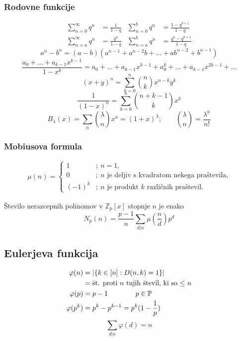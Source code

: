 	\subsubsection*{Rodovne funkcije}
	\[
		\begin{aligned}
			\sum_{n=0}^{\infty} q^n &= \frac{1}{1-q} &
			\sum_{n=0}^{b} q^n &= \frac{1-q^{b+1}}{1-q}
			\\
			\sum_{n=a}^{\infty} q^n &= \frac{q^{a}}{1-q} &
			\sum_{n=a}^{b} q^n &= \frac{q^a-q^{b+1}}{1-q}
		\end{aligned}
	\]
	\[
		a^n - b^n = (a-b)(a^{n-1} + a^{n-2}b + ... + ab^{n-2} + b^{n-1})  
	\]
	\[ \textstyle \frac{a_0 + ... + a_{k-1}x^{k-1}}{1-x^k} = a_0 + ... + a_{k-1}x^{k-1} + a_0^k + ... + a_{k-1}x^{2k-1} + ...\]
	\[ (x+y)^n = \sum_{k=0}^{n} \binom{n}{k} x^{n-k}y^{k} \]
	\[ \frac{1}{(1-x)^n} = \sum_{k=0}^{n} \binom{n+k-1}{k} x^{k} \]
	\[ B_\lambda(x) = \sum_{n} \binom{\lambda}{n} x^{n} = (1+x)^\lambda; \qquad \binom{\lambda}{n} = \frac{\lambda^{\underline{n}}}{n!}\]

	\subsubsection*{Mobiusova formula}
	\begin{align*}
		\mu(n) = \begin{cases}
			1 &;\ n = 1, \\
			0 &;\ \text{$n$ je deljiv s kvadratom nekega praštevila,} \\
			(-1)^k &;\ \text{$n$ je produkt $k$ različnih praštevil.}
		\end{cases}
	\end{align*}

	Število nerazcepnih polinomov v $\mathbb{Z}_p[x]$ stopnje $n$ je enako
	\[ N_p(n) = \frac{p-1}{n} \sum_{d|n} \mu(\frac{n}{d}) p^d\]

	\subsection*{Eulerjeva funkcija}
	\[ 
		\begin{aligned}
			\varphi (n) &= |\{k\in [n] : D(n,k) = 1 \}| \\
					&= \textmd{št. proti $n$ tujih števil, ki so $\leq$ $n$} \\
			\varphi(p) &= p-1 \qquad \qquad p \in \mathbb{P}\\
			\varphi(p^k) &= p^k-p^{k-1} = p^k(1-\frac{1}{p})\\
		\end{aligned}
	\]
	\[\sum_{d|n} \varphi(d) = n\]
